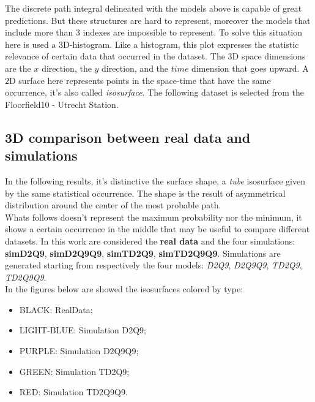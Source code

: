 \documentclass[class=article, crop=false]{standalone}
\begin{document}
The discrete path integral delineated with the models above is capable of great predictions.
But these structures are hard to represent, moreover the models that include more than 3 indexes are impossible to represent.
To solve this situation here is used a 3D-histogram.
Like a histogram, this plot expresses the statistic relevance of certain data that occurred in the dataset.
The 3D space dimensions are the $x$ direction, the $y$ direction, and the $time$ dimension that goes upward.
A 2D surface here represents points in the space-time that have the same occurrence, it's also called \emph{isosurface}.
The following dataset is selected from the Floorfield10 - Utrecht Station.

\subsection{3D comparison between real data and simulations}
In the following results, it's distinctive the surface shape, a \emph{tube} isosurface given by the same statistical occurrence.
The shape is the result of asymmetrical distribution around the center of the most probable path.
\\Whats follows doesn't represent the maximum probability nor the minimum, it shows a certain occurrence in the middle that may be useful to compare different datasets.
In this work are considered the \textbf{real data} and the four simulations: \textbf{simD2Q9}, \textbf{simD2Q9Q9}, \textbf{simTD2Q9}, \textbf{simTD2Q9Q9}.
Simulations are generated starting from respectively the four models: \emph{D2Q9}, \emph{D2Q9Q9}, \emph{TD2Q9}, \emph{TD2Q9Q9}.
\\In the figures below are showed the isosurfaces colored by type:
\begin{itemize}
\item BLACK: RealData;
\item LIGHT-BLUE: Simulation D2Q9;
\item PURPLE: Simulation D2Q9Q9;
\item GREEN: Simulation TD2Q9;
\item RED: Simulation TD2Q9Q9.
\end{itemize}

\FloatBarrier
\newpage
\end{document}
